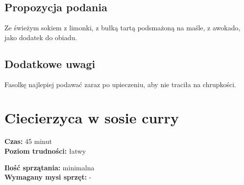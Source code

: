\documentclass[a4paper,10pt]{book}
\begin{document}
\vspace{0.5cm} 

\small
\subsection*{Propozycja podania}
Ze świeżym sokiem z limonki, z bułką tartą podsmażoną na maśle, z awokado, jako dodatek do obiadu.

\vspace{0.3cm}

\subsection*{Dodatkowe uwagi}
Fasolkę najlepiej podawać zaraz po upieczeniu, aby nie traciła na chrupkości.

\newpage 

\section{Ciecierzyca w sosie curry}
\bigskip
\small
\begin{minipage}{0.45\textwidth}
    \noindent \textbf{Czas:} 45 minut \\
    \textbf{Poziom trudności:} łatwy 
\end{minipage}
\begin{minipage}{0.45\textwidth}
    \noindent \textbf{Ilość sprzątania:} minimalna\\
    \textbf{Wymagany mysi sprzęt:} -
\end{minipage}
\normalsize
\vspace{0.5cm}
\end{document}
